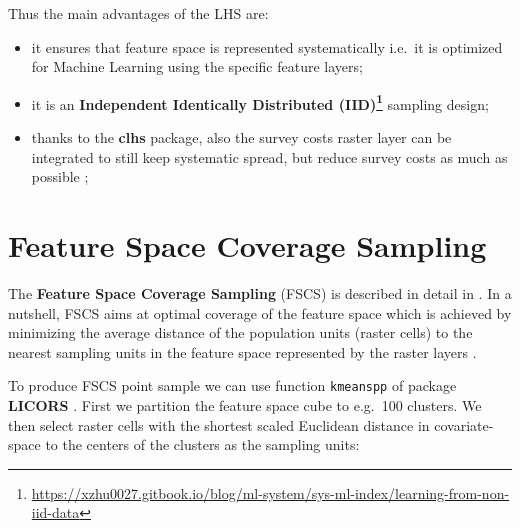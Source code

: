 \documentclass[
  graybox,natbib,nospthms]{svmono}
\providecommand{\tightlist}{%
  \setlength{\itemsep}{0pt}\setlength{\parskip}{0pt}}
\providecommand{\tightlist}{\setlength{\itemsep}{0pt}\setlength{\parskip}{0pt}}
\renewcommand{\href}[2]{#2 (\url{#1})}
\renewcommand{\href}[2]{#2\footnote{\url{#1}}}
\begin{document}
Thus the main advantages of the LHS are:

\begin{itemize}
\tightlist
\item
  it ensures that feature space is represented systematically i.e.~it is optimized
  for Machine Learning using the specific feature layers;\\
\item
  it is an \textbf{\href{https://xzhu0027.gitbook.io/blog/ml-system/sys-ml-index/learning-from-non-iid-data}{Independent Identically Distributed (IID)}} sampling design;\\
\item
  thanks to the \textbf{clhs} package, also the survey costs raster layer can be integrated to still
  keep systematic spread, but reduce survey costs as much as possible \citep{roudier2012conditioned};
\end{itemize}

\hypertarget{feature-space-coverage-sampling}{%
\section{Feature Space Coverage Sampling}\label{feature-space-coverage-sampling}}

The \textbf{Feature Space Coverage Sampling} (FSCS) is described in detail in \citet{BRUS2019464}.
In a nutshell, FSCS aims at optimal coverage of the feature space which is achieved
by minimizing the average distance of the population units (raster cells) to the
nearest sampling units in the feature space represented by the raster layers \citep{ma2020comparison}.

To produce FSCS point sample we can use function \texttt{kmeanspp} of package \textbf{LICORS} \citep{Goerg2013}.
First we partition the feature space cube to e.g.~100 clusters. We then select raster cells
with the shortest scaled Euclidean distance in covariate-space to the centers of
the clusters as the sampling units:
\end{document}
